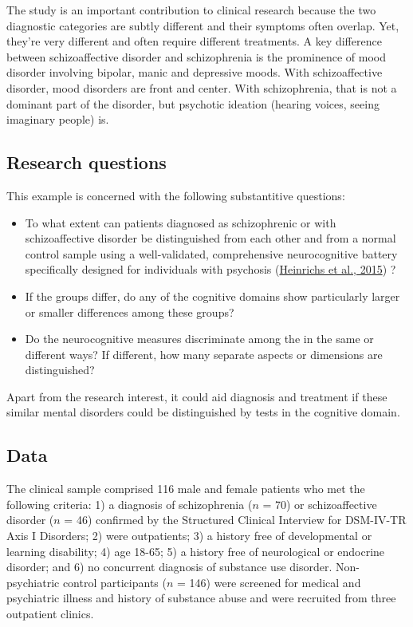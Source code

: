 \documentclass[
  letterpaper,
  10pt,
  krantz2]{krantz}
\begin{document}
The study is an important contribution to clinical research because the
two diagnostic categories are subtly different and their symptoms often
overlap. Yet, they're very different and often require different
treatments. A key difference between schizoaffective disorder and
schizophrenia is the prominence of mood disorder involving bipolar,
manic and depressive moods. With schizoaffective disorder, mood
disorders are front and center. With schizophrenia, that is not a
dominant part of the disorder, but psychotic ideation (hearing voices,
seeing imaginary people) is.

\hypertarget{research-questions}{%
\subsection{Research questions}\label{research-questions}}

This example is concerned with the following substantitive questions:

\begin{itemize}
\item
  To what extent can patients diagnosed as schizophrenic or with
  schizoaffective disorder be distinguished from each other and from a
  normal control sample using a well-validated, comprehensive
  neurocognitive battery specifically designed for individuals with
  psychosis (\protect\hyperlink{ref-Heinrichs-etal:2015}{Heinrichs et
  al., 2015}) ?
\item
  If the groups differ, do any of the cognitive domains show
  particularly larger or smaller differences among these groups?
\item
  Do the neurocognitive measures discriminate among the in the same or
  different ways? If different, how many separate aspects or dimensions
  are distinguished?
\end{itemize}

Apart from the research interest, it could aid diagnosis and treatment
if these similar mental disorders could be distinguished by tests in the
cognitive domain.

\hypertarget{data}{%
\subsection{Data}\label{data}}

The clinical sample comprised 116 male and female patients who met the
following criteria: 1) a diagnosis of schizophrenia (\(n\) = 70) or
schizoaffective disorder (\(n\) = 46) confirmed by the Structured
Clinical Interview for DSM-IV-TR Axis I Disorders; 2) were outpatients;
3) a history free of developmental or learning disability; 4) age 18-65;
5) a history free of neurological or endocrine disorder; and 6) no
concurrent diagnosis of substance use disorder. Non-psychiatric control
participants (\(n\) = 146) were screened for medical and psychiatric
illness and history of substance abuse and were recruited from three
outpatient clinics.
\end{document}
